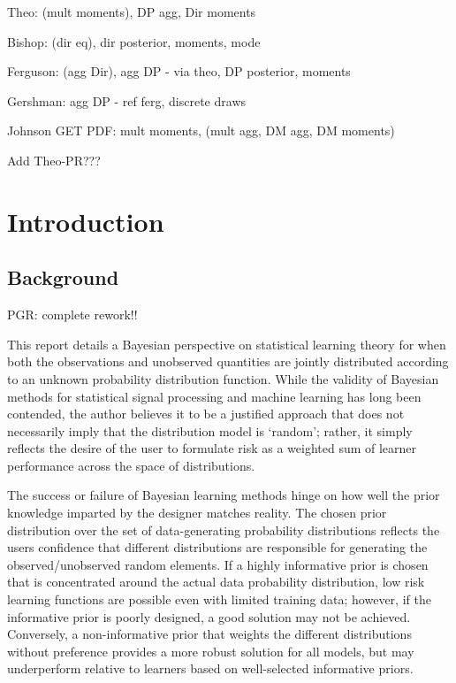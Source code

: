 \documentclass[12pt]{report}
\newcommand{\todolow}[1]{\todo[inline,color=blue!50,linecolor=red]{#1}}
\begin{document}
\todolow{bibliography}

Theo: (mult moments), DP agg, Dir moments

Bishop: (dir eq), dir posterior, moments, mode

Ferguson: (agg Dir), agg DP - via theo, DP posterior, moments

Gershman: agg DP - ref ferg, discrete draws

Johnson GET PDF: mult moments, (mult agg, DM agg, DM moments)

Add Theo-PR???

\newpage





\chapter{Introduction}


\section{Background}

PGR: complete rework!!

This report details a Bayesian perspective on statistical learning theory for when both the observations and unobserved quantities are jointly distributed according to an unknown probability distribution function. While the validity of Bayesian methods for statistical signal processing and machine learning has long been contended, the author believes it to be a justified approach that does not necessarily imply that the distribution model is `random'; rather, it simply reflects the desire of the user to formulate risk as a weighted sum of learner performance across the space of distributions. 

The success or failure of Bayesian learning methods hinge on how well the prior knowledge imparted by the designer matches reality. The chosen prior distribution over the set of data-generating probability distributions reflects the users confidence that different distributions are responsible for generating the observed/unobserved random elements. If a highly informative prior \cite{box} is chosen that is concentrated around the actual data probability distribution, low risk learning functions are possible even with limited training data; however, if the informative prior is poorly designed, a good solution may not be achieved. Conversely, a non-informative prior that weights the different distributions without preference provides a more robust solution for all models, but may underperform relative to learners based on well-selected informative priors.
\end{document}
